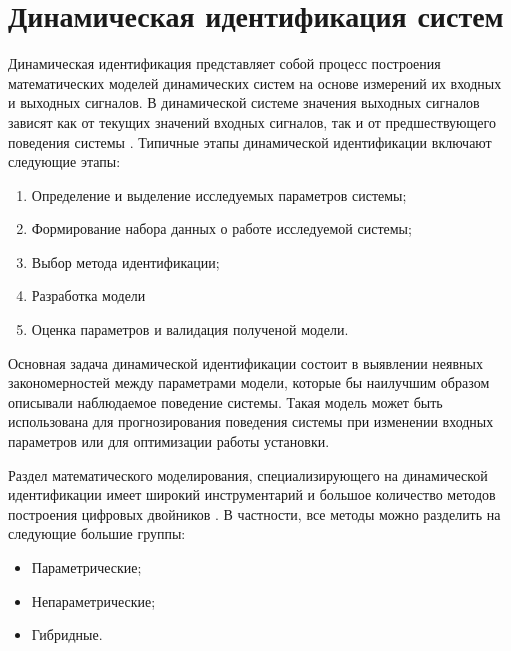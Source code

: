 \chapter{Динамическая идентификация систем}

Динамическая идентификация представляет собой процесс построения математических
моделей динамических систем на основе измерений их входных и выходных сигналов.
В динамической системе значения выходных сигналов зависят как от текущих
значений входных сигналов, так и от предшествующего поведения системы
\cite{bb:identification}. Типичные этапы динамической идентификации включают
следующие этапы: 

\begin{enumerate}
  \item Определение и выделение исследуемых параметров системы;
  \item Формирование набора данных о работе исследуемой системы;
  \item Выбор метода идентификации;
  \item Разработка модели
  \item Оценка параметров и валидация полученой модели.
\end{enumerate}

Основная задача динамической идентификации состоит в выявлении неявных
закономерностей между параметрами модели, которые бы наилучшим образом описывали
наблюдаемое поведение системы. Такая модель может быть использована для
прогнозирования поведения системы при изменении входных параметров или для
оптимизации работы установки. 

Раздел математического моделирования, специализирующего на динамической
идентификации имеет широкий инструментарий и большое количество методов
построения цифровых двойников \cite{bib:ident:autoregr}. В частности, все методы
можно разделить на следующие большие группы:

\begin{itemize}
  \item Параметрические;
  \item Непараметрические;
  \item Гибридные.
\end{itemize}

